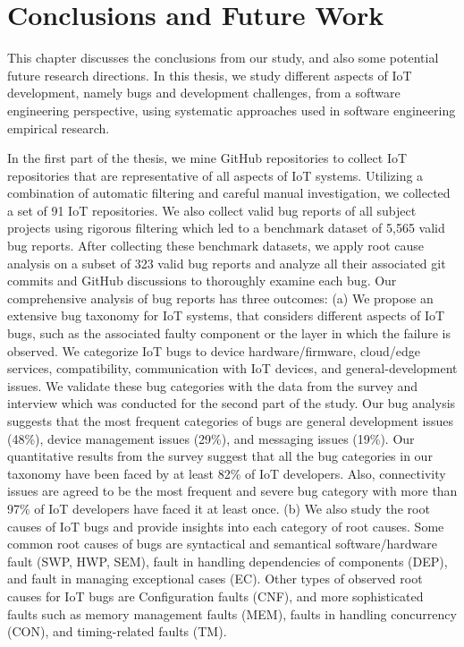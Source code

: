 
\chapter{Conclusions and Future Work}
\label{ch:conclusion}
This chapter discusses the conclusions from our study, and also some potential future research directions. In this thesis, we study different aspects of IoT development, namely bugs and development challenges, from a software engineering perspective, using systematic approaches used in software engineering empirical research. 

In the first part of the thesis, we mine GitHub repositories to collect IoT repositories that are representative of all aspects of IoT systems. Utilizing a combination of automatic filtering and careful manual investigation, we collected a set of 91 IoT repositories. We also collect valid bug reports of all subject projects using rigorous filtering which led to a benchmark dataset of 5,565 valid bug reports. After collecting these benchmark datasets, we apply root cause analysis on a subset of 323 valid bug reports and analyze all their associated git commits and GitHub discussions to thoroughly examine each bug. Our comprehensive analysis of bug reports has three outcomes: (a) We propose an extensive bug taxonomy for IoT systems, that considers different aspects of IoT bugs, such as the associated faulty component or the layer in which the failure is observed. We categorize IoT bugs to device hardware/firmware, cloud/edge services, compatibility, communication with IoT devices, and general-development issues. We validate these bug categories with the data from the survey and interview which was conducted for the second part of the study. Our bug analysis suggests that the most frequent categories of bugs are 
general development issues (48\%), device management issues (29\%), and messaging issues (19\%). Our quantitative results from the survey suggest that all the bug categories in our taxonomy have been faced by at least 82\% of IoT developers. Also, connectivity issues are agreed to be the most frequent and severe bug category with more than 97\% of IoT developers have faced it at least once. (b) We also study the root causes of IoT bugs and provide insights into each category of root causes. Some common root causes of bugs are syntactical and semantical software/hardware fault (SWP, HWP, SEM), fault in handling dependencies of components (DEP), and fault in managing exceptional cases (EC). Other types of observed root causes for IoT bugs are Configuration faults (CNF), and more sophisticated faults such as memory management faults (MEM), faults in handling concurrency (CON), and timing-related faults (TM).

